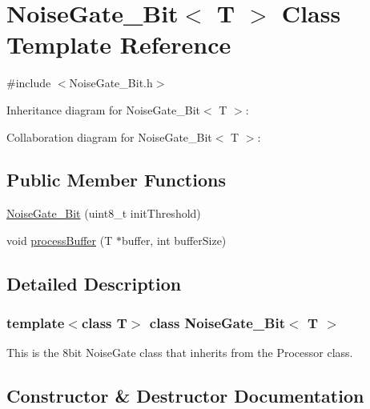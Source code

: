 \hypertarget{classNoiseGate__8Bit}{}\section{Noise\+Gate\+\_\+Bit$<$ T $>$ Class Template Reference}
\label{classNoiseGate__8Bit}


{\ttfamily \#include $<$Noise\+Gate\+\_\+Bit.\+h$>$}



Inheritance diagram for Noise\+Gate\+\_\+Bit$<$ T $>$\+:


Collaboration diagram for Noise\+Gate\+\_\+Bit$<$ T $>$\+:
\subsection*{Public Member Functions}
\begin{DoxyCompactItemize}
\item 
\hyperlink{classNoiseGate__8Bit_a2f36053530ecb282e442be9d991b13be}{Noise\+Gate\+\_\+Bit} (uint8\+\_\+t init\+Threshold)
\item 
void \hyperlink{classNoiseGate__8Bit_a76df76db3661572eb4f96bf7094df31b}{process\+Buffer} (T $\ast$buffer, int buffer\+Size)
\end{DoxyCompactItemize}


\subsection{Detailed Description}
\subsubsection*{template$<$class T$>$\newline
class Noise\+Gate\+\_\+Bit$<$ T $>$}

This is the 8bit Noise\+Gate class that inherits from the Processor class. 

\subsection{Constructor \& Destructor Documentation}
\mbox{\label{classNoiseGate__8Bit_a2f36053530ecb282e442be9d991b13be}} 
